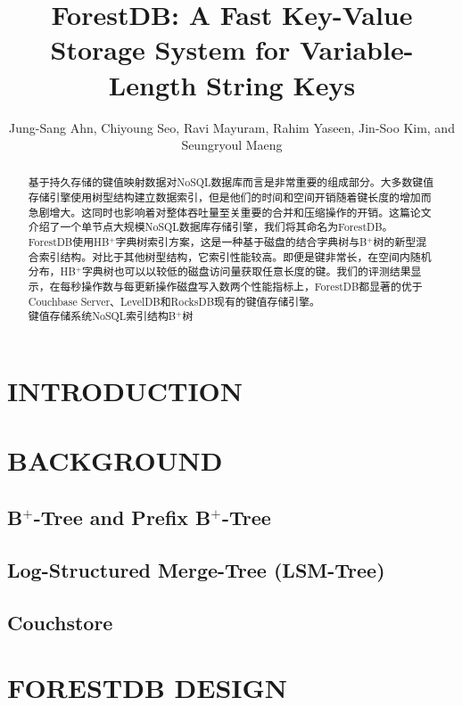 \documentclass[lang=cn]{elegantpaper}
\title{ForestDB: A Fast Key-Value Storage System for Variable-Length String Keys}
\author{Jung-Sang Ahn, Chiyoung Seo, Ravi Mayuram, Rahim Yaseen, Jin-Soo Kim, and Seungryoul Maeng}
\begin{document}
\maketitle

\begin{abstract}
\noindent \sffamily 基于持久存储的键值映射数据对NoSQL数据库而言是非常重要的组成部分。大多数键值存储引擎使用树型结构建立数据索引，但是他们的时间和空间开销随着键长度的增加而急剧增大。这同时也影响着对整体吞吐量至关重要的合并和压缩操作的开销。这篇论文介绍了一个单节点大规模NoSQL数据库存储引擎，我们将其命名为ForestDB。ForestDB使用HB$^+$字典树索引方案，这是一种基于磁盘的结合字典树与B$^+$树的新型混合索引结构。对比于其他树型结构，它索引性能较高。即便是键非常长，在空间内随机分布，HB$^+$字典树也可以以较低的磁盘访问量获取任意长度的键。我们的评测结果显示，在每秒操作数与每更新操作磁盘写入数两个性能指标上，ForestDB都显著的优于Couchbase Server、LevelDB和RocksDB现有的键值存储引擎。\\

\noindent {} 键值存储系统\quad NoSQL\quad 索引结构\quad B$^+$树
\end{abstract}

\section{INTRODUCTION}

\newpage

\section{BACKGROUND}
      
\subsection{B$^+$-Tree and Prefix B$^+$-Tree}

\subsection{Log-Structured Merge-Tree (LSM-Tree)}

\subsection{Couchstore}

\newpage

\section{FORESTDB DESIGN}
\end{document}
